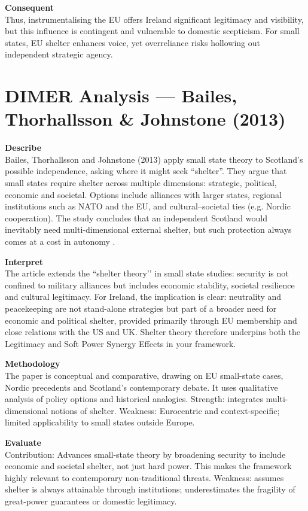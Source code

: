 \textbf{Consequent} \\
Thus, instrumentalising the EU offers Ireland significant legitimacy and visibility, but this influence is contingent and vulnerable to domestic scepticism. For small states, EU shelter enhances voice, yet overreliance risks hollowing out independent strategic agency.  


\section*{DIMER Analysis — Bailes, Thorhallsson \& Johnstone (2013)}

\textbf{Describe} \\
Bailes, Thorhallsson and Johnstone (2013) apply small state theory to Scotland’s possible independence, asking where it might seek ``shelter''. They argue that small states require shelter across multiple dimensions: strategic, political, economic and societal. Options include alliances with larger states, regional institutions such as NATO and the EU, and cultural–societal ties (e.g. Nordic cooperation). The study concludes that an independent Scotland would inevitably need multi-dimensional external shelter, but such protection always comes at a cost in autonomy \parencite{BAILES_2013}.

\textbf{Interpret} \\
The article extends the ``shelter theory’’ in small state studies: security is not confined to military alliances but includes economic stability, societal resilience and cultural legitimacy. For Ireland, the implication is clear: neutrality and peacekeeping are not stand-alone strategies but part of a broader need for economic and political shelter, provided primarily through EU membership and close relations with the US and UK. Shelter theory therefore underpins both the Legitimacy and Soft Power Synergy Effects in your framework.

\textbf{Methodology} \\
The paper is conceptual and comparative, drawing on EU small-state cases, Nordic precedents and Scotland’s contemporary debate. It uses qualitative analysis of policy options and historical analogies. Strength: integrates multi-dimensional notions of shelter. Weakness: Eurocentric and context-specific; limited applicability to small states outside Europe.

\textbf{Evaluate} \\
Contribution: Advances small-state theory by broadening security to include economic and societal shelter, not just hard power. This makes the framework highly relevant to contemporary non-traditional threats. Weakness: assumes shelter is always attainable through institutions; underestimates the fragility of great-power guarantees or domestic legitimacy.  

